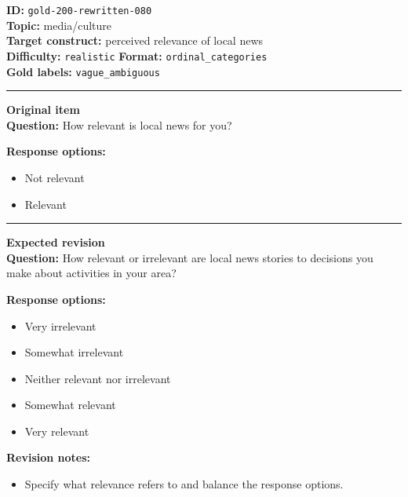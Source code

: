 \documentclass[10pt,a4paper]{article}
\newcommand{\sectionline}{\vspace{0.15em}\hrule\vspace{0.35em}}
\begin{document}
\begin{tcolorbox}[colframe=FlawRed,colback=white,colbacktitle=FlawRed!9,coltitle=black,title={Item 080\hfill Flawed item}]
\textbf{ID:} \texttt{gold-200-rewritten-080}\\
\textbf{Topic:} media/culture\\
\textbf{Target construct:} perceived relevance of local news\\
\textbf{Difficulty:} \texttt{realistic} \quad \textbf{Format:} \texttt{ordinal\_categories}\\
\textbf{Gold labels:} \texttt{vague\_ambiguous}\\
\sectionline
\textbf{Original item}\\
\textbf{Question:} How relevant is local news for you?
\par\textbf{Response options:}
\begin{itemize}
\item Not relevant
\item Relevant
\end{itemize}
\sectionline
\textbf{Expected revision}\\
\textbf{Question:} How relevant or irrelevant are local news stories to decisions you make about activities in your area?
\par\textbf{Response options:}
\begin{itemize}
\item Very irrelevant
\item Somewhat irrelevant
\item Neither relevant nor irrelevant
\item Somewhat relevant
\item Very relevant
\end{itemize}
\par\textbf{Revision notes:}
\begin{itemize}
\item Specify what relevance refers to and balance the response options.
\end{itemize}
\end{tcolorbox}
\end{document}
